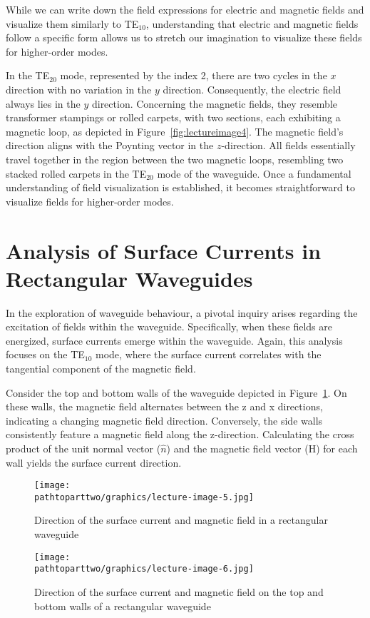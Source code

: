 While we can write down the field expressions for electric and magnetic fields and visualize them similarly to TE$_{10}$, understanding that electric and magnetic fields follow a specific form allows us to stretch our imagination to visualize these fields for higher-order modes.

In the TE$_{20}$ mode, represented by the index 2, there are two cycles in the $x$ direction with no variation in the $y$ direction. Consequently, the electric field always lies in the $y$ direction. Concerning the magnetic fields, they resemble transformer stampings or rolled carpets, with two sections, each exhibiting a magnetic loop, as depicted in Figure~\ref{fig:lectureimage4}. The magnetic field's direction aligns with the Poynting vector in the $z$-direction. All fields essentially travel together in the region between the two magnetic loops, resembling two stacked rolled carpets in the TE$_{20}$ mode of the waveguide. Once a fundamental understanding of field visualization is established, it becomes straightforward to visualize fields for higher-order modes.

\section{Analysis of Surface Currents in Rectangular Waveguides}
In the exploration of waveguide behaviour, a pivotal inquiry arises regarding the excitation of fields within the waveguide. Specifically, when these fields are energized, surface currents emerge within the waveguide. Again,  this analysis focuses on the TE$_{10}$ mode, where the surface current correlates with the tangential component of the magnetic field.

Consider the top and bottom walls of the waveguide depicted in Figure~\ref{fig:lectureimage5}. On these walls, the magnetic field alternates between the z and x directions, indicating a changing magnetic field direction. Conversely, the side walls consistently feature a magnetic field along the z-direction. Calculating the cross product of the unit normal vector ($\hat{n}$) and the magnetic field vector (H) for each wall yields the surface current direction.
\begin{figure}[h]
\centering
\texttt{[image: \\pathtoparttwo/graphics/lecture-image-5.jpg]}
\caption{Direction of the surface current and magnetic field in a rectangular waveguide}
\label{fig:lectureimage5}
\end{figure}
\begin{figure}[h]
\centering
\texttt{[image: \\pathtoparttwo/graphics/lecture-image-6.jpg]}
\caption{Direction of the surface current and magnetic field on the top and bottom walls of a rectangular waveguide}
\label{fig:lectureimage6}
\end{figure}

